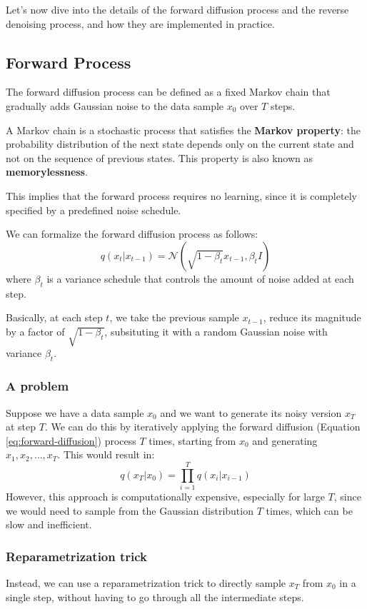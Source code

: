 Let's now dive into the details of the forward diffusion process and the reverse denoising process, and how they are implemented in practice.

\subsection{Forward Process}
The forward diffusion process can be defined as a fixed Markov chain that gradually adds Gaussian noise to the data sample $x_0$ over $T$ steps.

{
    A Markov chain is a stochastic process that satisfies the \textbf{Markov property}: 
    the probability distribution of the next state depends only on the current state and not on the sequence of previous states. 
    This property is also known as \textbf{memorylessness}.
}

This implies that the forward process requires no learning, since it is completely specified by a predefined noise schedule.

We can formalize the forward diffusion process as follows:
\begin{equation}
    \label{eq:forward-diffusion}
    q(x_t | x_{t-1}) = \mathcal{N}(\sqrt{{1 - \beta_t}} x_{t-1}, \beta_t I)
\end{equation}
where $\beta_t$ is a variance schedule that controls the amount of noise added at each step. 

Basically, at each step $t$, we take the previous sample $x_{t-1}$, reduce its magnitude by a factor of $\sqrt{1 - \beta_t}$, subsituting it with a random Gaussian noise with variance $\beta_t$.

\subsubsection{A problem}
Suppose we have a data sample $x_0$ and we want to generate its noisy version $x_T$ at step $T$.
We can do this by iteratively applying the forward diffusion (Equation \ref{eq:forward-diffusion}) process $T$ times, starting from $x_0$ and generating $x_1, x_2, \ldots, x_T$.
This would result in:
\[
    q(x_T | x_0) = \prod_{i=1}^{T} q(x_i | x_{i-1})
\]
However, this approach is computationally expensive, especially for large $T$, since we would need to sample from the Gaussian distribution $T$ times, which can be slow and inefficient.

\subsubsection{Reparametrization trick}
Instead, we can use a reparametrization trick to directly sample $x_T$ from $x_0$ in a single step, without having to go through all the intermediate steps.

